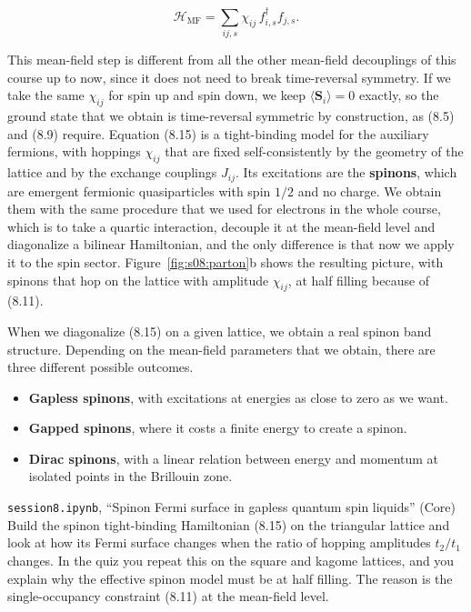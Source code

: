 \begin{equation}
\mathcal H_\text{MF} = \sum_{ij,s} \chi_{ij}\, f^\dagger_{i,s} f_{j,s}.
\end{equation}

This mean-field step is different from all the other mean-field decouplings of this course up
to now, since it does not need to break time-reversal symmetry. If we take the same $\chi_{ij}$ for spin up and spin down, we keep
$\langle \mathbf S_i\rangle = 0$ exactly, so the ground state that we obtain is time-reversal
symmetric by construction, as (8.5) and (8.9) require. Equation (8.15) is a tight-binding model for
the auxiliary fermions, with hoppings $\chi_{ij}$ that are fixed self-consistently by the geometry
of the lattice and by the exchange couplings $J_{ij}$. Its excitations are the \textbf{spinons},
which are emergent fermionic quasiparticles with spin $1/2$ and no charge. We obtain them with the
same procedure that we used for electrons in the whole course, which is to take a quartic
interaction, decouple it at the mean-field level and diagonalize a bilinear Hamiltonian, and the
only difference is that now we apply it to the spin sector. Figure~\ref{fig:s08:parton}b shows the
resulting picture, with spinons that hop on the lattice with amplitude $\chi_{ij}$, at half filling
because of (8.11).



When we diagonalize (8.15) on a given lattice, we obtain a real spinon band structure. Depending on
the mean-field parameters that we obtain, there are three different possible outcomes.

\begin{itemize}
\item \textbf{Gapless spinons}, with excitations at energies as close to zero as we want.
\item \textbf{Gapped spinons}, where it costs a finite energy to create a spinon.
\item \textbf{Dirac spinons}, with a linear relation between energy and momentum at isolated points
  in the Brillouin zone.
\end{itemize}

\begin{notebookbox}{\texttt{session8.ipynb}, ``Spinon Fermi surface in gapless quantum spin liquids'' (Core)}
Build the spinon tight-binding Hamiltonian (8.15) on the triangular lattice and look at how its
Fermi surface changes when the ratio of hopping amplitudes $t_2/t_1$ changes. In the quiz you
repeat this on the square and kagome lattices, and you explain why the effective spinon model must
be at half filling. The reason is the single-occupancy constraint (8.11) at the mean-field level.
\end{notebookbox}

